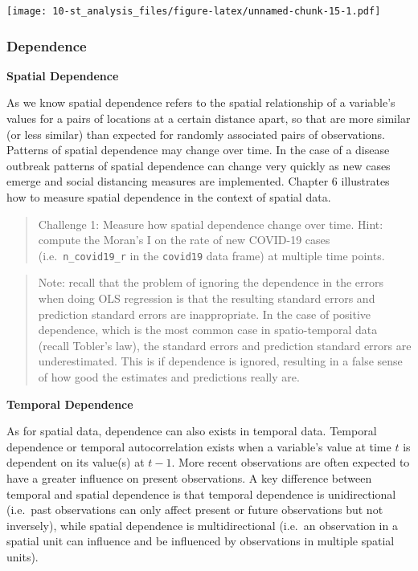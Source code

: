 \documentclass[
]{book}
\begin{document}
\texttt{[image: 10-st\_analysis\_files/figure-latex/unnamed-chunk-15-1.pdf]}

\hypertarget{dependence}{%
\subsubsection{Dependence}\label{dependence}}

\textbf{Spatial Dependence}

As we know spatial dependence refers to the spatial relationship of a variable's values for a pairs of locations at a certain distance apart, so that are more similar (or less similar) than expected for randomly associated pairs of observations. Patterns of spatial dependence may change over time. In the case of a disease outbreak patterns of spatial dependence can change very quickly as new cases emerge and social distancing measures are implemented. Chapter 6 illustrates how to measure spatial dependence in the context of spatial data.

\begin{quote}
Challenge 1: Measure how spatial dependence change over time. Hint: compute the Moran's I on the rate of new COVID-19 cases (i.e.~\texttt{n\_covid19\_r} in the \texttt{covid19} data frame) at multiple time points.
\end{quote}

\begin{quote}
Note: recall that the problem of ignoring the dependence in the errors when doing OLS regression is that the resulting standard errors and prediction standard errors are inappropriate. In the case of positive dependence, which is the most common case in spatio-temporal data (recall Tobler's law), the standard errors and prediction standard errors are underestimated. This is if dependence is ignored, resulting in a false sense of how good the estimates and predictions really are.
\end{quote}

\textbf{Temporal Dependence}

As for spatial data, dependence can also exists in temporal data. Temporal dependence or temporal autocorrelation exists when a variable's value at time \(t\) is dependent on its value(s) at \(t-1\). More recent observations are often expected to have a greater influence on present observations. A key difference between temporal and spatial dependence is that temporal dependence is unidirectional (i.e.~past observations can only affect present or future observations but not inversely), while spatial dependence is multidirectional (i.e.~an observation in a spatial unit can influence and be influenced by observations in multiple spatial units).
\end{document}

